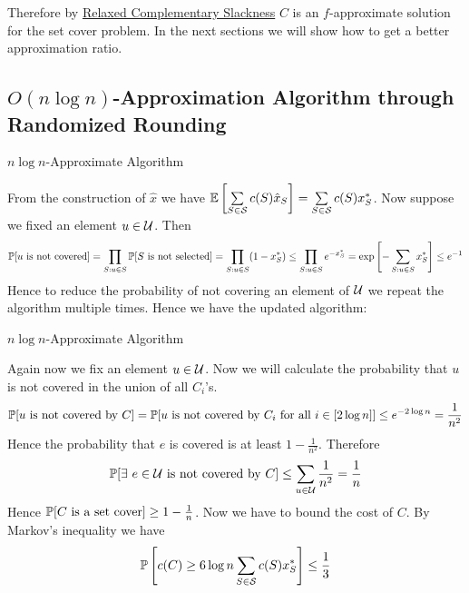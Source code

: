 Therefore by \hyperref[th:relaxed-cs]{Relaxed Complementary Slackness} $C$ is an $f$-approximate solution for the set cover problem. In the next sections we will show how to get a better approximation ratio.


\subsection{\texorpdfstring{$O(n\log n)$}{O(nlogn)}-Approximation Algorithm through Randomized Rounding}

\begin{algorithm}\DontPrintSemicolon
	\caption{$n\log n$-Approximate Algorithm}
\end{algorithm}
\newpage 

\parinf
From the construction of $\hat{x}$ we have $\mathbb{E}\left[\sum\limits_{S\in\mathcal{S}}c(S)\hat{x}_S\right]=\sum\limits_{S\in\mathcal{S}}c(S)x^*_S$. Now suppose we fixed an element $u\in\mathcal{U}$. Then $$\mathbb{P}[u \text{ is not covered}]=\prod\limits_{S:u\in S}\mathbb{P}[S\text{ is not selected}]=\prod\limits_{S:u\in S}(1-x^*_S)\leq \prod_{S:u\in S}e^{-x^*_S}=\exp\left[-\sum\limits_{S:u\in S}x^*_S\right]\leq e^{-1}$$Hence to reduce the probability of not covering an element of $\mathcal{U}$ we repeat the algorithm multiple times. Hence we have the updated algorithm:
\begin{algorithm}\DontPrintSemicolon
	\caption{$n\log n$-Approximate Algorithm}
\end{algorithm}

Again now we fix an element $u\in \mathcal{U}$. Now we will calculate the probability that $u$ is not covered in the union of all $C_i$'s. $$\mathbb{P}[u \text{ is not covered by }C]=\mathbb{P}[u \text{ is not covered by }C_i\text{ for all }i\in [2\log n]]\leq e^{-2\log n}=\frac{1}{n^2}$$
Hence the probability that $e$ is covered is at least $1-\frac{1}{n^2}$. Therefore $$\mathbb{P}[\exists\ e\in\mathcal{U}\text{ is not covered by }C]\leq \sum\limits_{u\in\mathcal{U}}\frac1{n^2}=\frac1n$$Hence $\mathbb{P}[C\text{ is a set cover}]\geq 1-\frac1n$. Now we have to bound the cost of $C$. By Markov's inequality we have $$\mathbb{P}\left[c(C)\geq 6\log n\sum\limits_{S\in\mathcal{S}}c(S)x^*_S\right]\leq \frac13$$

